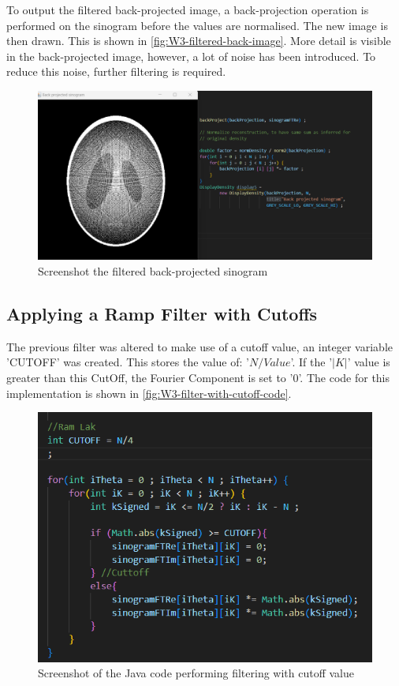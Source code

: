 To output the filtered back-projected image, a back-projection operation is performed on the sinogram before the values are normalised. The new image is then drawn. This is shown in \autoref{fig:W3-filtered-back-image}. More detail is visible in the back-projected image, however, a lot of noise has been introduced. To reduce this noise, further filtering is required.
    
\begin{figure}[H] 
    \centering
    \includegraphics[width=1\columnwidth]{Figures/Week 3/filtered-back-projection.png}
    \caption{Screenshot the filtered back-projected sinogram}
    \label{fig:W3-filtered-back-image}
\end{figure}


\subsection{Applying a Ramp Filter with Cutoffs}
The previous filter was altered to make use of a cutoff value, an integer variable 'CUTOFF' was created. This stores the value of: '$N / Value$'. If the '$|K|$' value is greater than this CutOff, the Fourier Component is set to '0'. The code for this implementation is shown in \autoref{fig:W3-filter-with-cutoff-code}.

\begin{figure}[H] 
    \centering
    \includegraphics[width=1\columnwidth]{Figures/Week 3/Filter-with-cuttoff-code.png}
    \caption{Screenshot of the Java code performing filtering with cutoff value}
    \label{fig:W3-filter-with-cutoff-code}
\end{figure}



